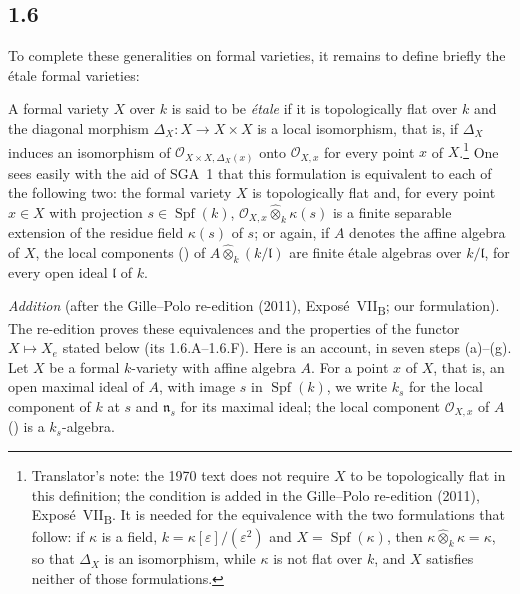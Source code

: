 
\subsection*{1.6}
\label{sga3:VIIB:1.6}

To complete these generalities on formal varieties, it remains to
define briefly the étale formal varieties:

A formal variety \(X\) over \(k\) is said to be \emph{étale} if it is
topologically flat over \(k\) and the diagonal morphism
\(\Delta_X:X\to X\times X\) is a local isomorphism, that is, if
\(\Delta_X\) induces an isomorphism of
\(\mathcal O_{X\times X,\Delta_X(x)}\) onto \(\mathcal O_{X,x}\) for
every point \(x\) of \(X\).\footnote{Translator's note: the 1970 text
does not require \(X\) to be topologically flat in this definition; the
condition is added in the Gille--Polo re-edition (2011),
Exposé~VII\textsubscript{B}. It is needed for the equivalence with the two
formulations that follow: if \(\kappa\) is a field,
\(k=\kappa[\varepsilon]/(\varepsilon^2)\) and
\(X=\operatorname{Spf}(\kappa)\), then
\(\kappa\widehat\otimes_k\kappa=\kappa\), so that \(\Delta_X\) is an
isomorphism, while \(\kappa\) is not flat over \(k\), and \(X\) satisfies
neither of those formulations.} One sees easily with the aid of SGA~1 that
this formulation is equivalent to each of the following two: the formal
variety \(X\) is topologically flat and, for every point \(x\in X\)
with projection \(s\in\operatorname{Spf}(k)\),
\(\mathcal O_{X,x}\widehat\otimes_k\kappa(s)\) is a finite separable
extension of the residue field \(\kappa(s)\) of \(s\); or again, if
\(A\) denotes the affine algebra of \(X\), the local components
\textup{()} of \(A\widehat\otimes_k(k/\mathfrak l)\) are finite étale
algebras over \(k/\mathfrak l\), for every open ideal \(\mathfrak l\)
of \(k\).

\medskip\noindent
\emph{Addition} (after the Gille--Polo re-edition (2011),
Exposé~VII\textsubscript{B}; our formulation). The re-edition proves
these equivalences and the properties of the functor \(X\mapsto X_e\)
stated below (its 1.6.A--1.6.F). Here is an account, in seven steps
\textup{(a)}--\textup{(g)}. Let \(X\) be a formal \(k\)-variety with
affine algebra \(A\). For a point \(x\) of \(X\), that is, an open
maximal ideal of \(A\), with image \(s\) in \(\operatorname{Spf}(k)\),
we write \(k_s\) for the local component of \(k\) at \(s\) and
\(\mathfrak n_s\) for its maximal ideal; the local component
\(\mathcal O_{X,x}\) of \(A\) \textup{()} is a \(k_s\)-algebra.

